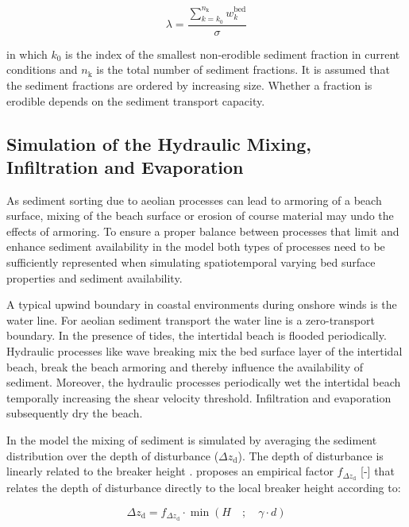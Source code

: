 \begin{equation}
\label{eq:roughness_density}
\lambda = \frac{\sum_{k=k_0}^{n_{\mathrm{k}}}{w_k^{\mathrm{bed}}}}{\sigma}
\end{equation}

\noindent in which $k_0$ is the index of the smallest non-erodible
sediment fraction in current conditions and $n_{\mathrm{k}}$ is the
total number of sediment fractions. It is assumed that the sediment
fractions are ordered by increasing size. Whether a fraction is
erodible depends on the sediment transport capacity.

\subsection{Simulation of the Hydraulic Mixing, Infiltration and
  Evaporation} \label{sec:marine_processes}

As sediment sorting due to aeolian processes can lead to armoring of a
beach surface, mixing of the beach surface or erosion of course
material may undo the effects of armoring. To ensure a proper balance
between processes that limit and enhance sediment availability in the
model both types of processes need to be sufficiently represented when
simulating spatiotemporal varying bed surface properties and sediment
availability.

A typical upwind boundary in coastal environments during onshore winds
is the water line. For aeolian sediment transport the water line is a
zero-transport boundary. In the presence of tides, the intertidal
beach is flooded periodically. Hydraulic processes like wave breaking
mix the bed surface layer of the intertidal beach, break the beach
armoring and thereby influence the availability of sediment. Moreover,
the hydraulic processes periodically wet the intertidal beach
temporally increasing the shear velocity threshold. Infiltration and
evaporation subsequently dry the beach.

In the model the mixing of sediment is simulated by averaging the
sediment distribution over the depth of disturbance
($\Delta z_{\mathrm{d}}$). The depth of disturbance is linearly
related to the breaker height \citep[e.g.][]{King1951, Williams1971,
  Masselink2007}. \citet{Masselink2007} proposes an empirical factor
$f_{\Delta z_{\mathrm{d}}}$ [-] that relates the depth of disturbance
directly to the local breaker height according to:

\begin{equation}
  \label{eq:dod}
  \Delta z_{\mathrm{d}} = f_{\Delta z_{\mathrm{d}}} \cdot \min \left ( H \quad ; \quad \gamma \cdot d \right )
\end{equation}

